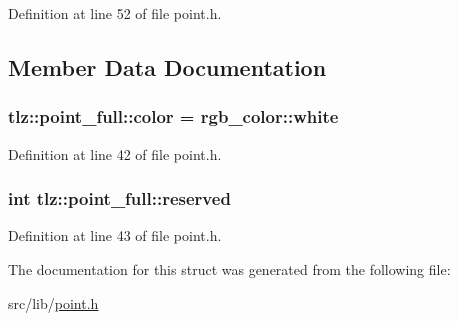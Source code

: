 Definition at line 52 of file point.\+h.



\subsection{Member Data Documentation}
\subsubsection[{\texorpdfstring{color}{color}}]{ tlz\+::point\+\_\+full\+::color = {\bf rgb\+\_\+color\+::white}}\hypertarget{structtlz_1_1point__full_a9d4008e552791fe881aa1019de53423a}{}\label{structtlz_1_1point__full_a9d4008e552791fe881aa1019de53423a}


Definition at line 42 of file point.\+h.

\subsubsection[{\texorpdfstring{reserved}{reserved}}]{\setlength{\rightskip}{0pt plus 5cm}int tlz\+::point\+\_\+full\+::reserved}\hypertarget{structtlz_1_1point__full_a46d3fc00cb551da3321bd631fd24d307}{}\label{structtlz_1_1point__full_a46d3fc00cb551da3321bd631fd24d307}


Definition at line 43 of file point.\+h.



The documentation for this struct was generated from the following file\+:\begin{DoxyCompactItemize}
\item 
src/lib/\hyperlink{point_8h}{point.\+h}\end{DoxyCompactItemize}
